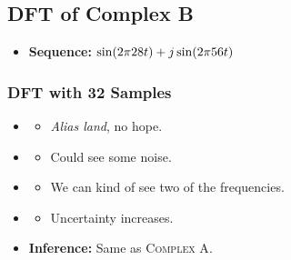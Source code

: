 \documentclass[../../course]{subfiles}
\begin{document}
\pagebreak

\subsection{DFT of Complex B} \label{ssec:dftCplxB}

\begin{itemize} [label=]

    \item \textbf{Sequence:} $\sin(2 \pi 28 t) + j \sin(2 \pi 56 t)$

\end{itemize}

\subsubsection{DFT with 32 Samples}

\begin{itemize} [label=]

    \item \sampFreqMuchLess
        \begin{itemize} [label=]
            \item \emph{Alias land}, no hope.
        \end{itemize}

    \item \sampFreqNorm
        \begin{itemize} [label=]
            \item Could see some noise.
        \end{itemize}

    \item \sampFreqSligGreat
        \begin{itemize} [label=]
            \item We can kind of see two of the frequencies.
        \end{itemize}

    \item \sampFreqMuchGreat
        \begin{itemize} [label=]
            \item Uncertainty increases.
        \end{itemize}

    \item \textbf{Inference:} Same as \textsc{Complex A}.

\end{itemize}

\vfill
\end{document}
